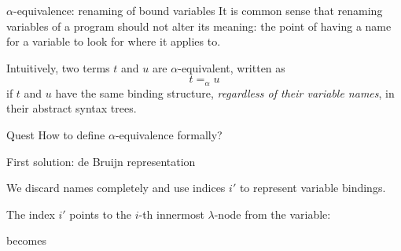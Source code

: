 \begin{frame}{$\alpha$-equivalence: renaming of bound variables}
  It is common sense that renaming variables of a program should not alter its meaning: the point of having a name for a variable to look for where it applies to.

  \vfill
  Intuitively, two terms $t$ and $u$ are \alert{$\alpha$-equivalent}, written as
  \[
    t =_\alpha u
  \]
  if $t$ and $u$ have the same binding structure, \emph{regardless of their variable names}, in their abstract syntax trees.
  \vfill
  \begin{alertblock}{Quest}
    How to define $\alpha$-equivalence formally?
  \end{alertblock}
\end{frame}

\begin{frame}{First solution: de Bruijn representation}
  \begin{idea}
    We discard names completely and use indices $i'$ to represent variable bindings.
  \end{idea}

  The index $i'$ points to the $i$-th innermost $\lambda$-node from the variable: 
  \begin{center}
    \begin{minipage}{.4\textwidth}
    \end{minipage}
    becomes
    \begin{minipage}{.4\textwidth}
\end{minipage}
\end{center}
\end{frame}
